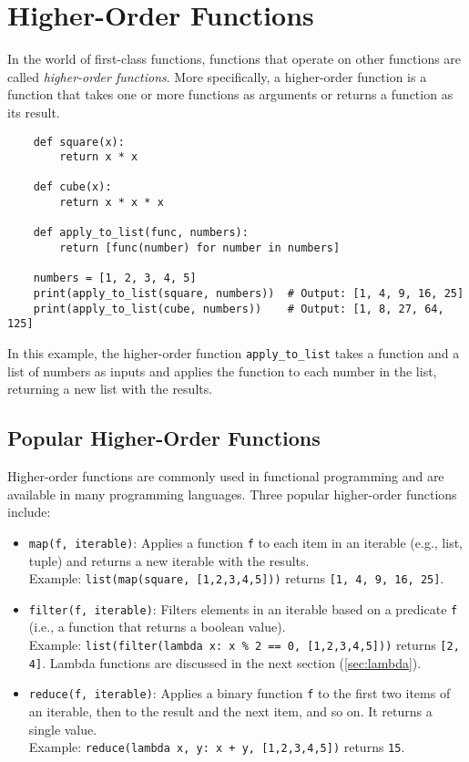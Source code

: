 \documentclass[oneside,11pt,dvipsnames]{book}
\newcommand{\code}[1]{\texttt{#1}}
\begin{document}
\section{Higher-Order Functions}\label{sec:higher-order}

In the world of first-class functions, functions that operate on other functions are called \emph{higher-order functions}. More specifically, a higher-order function is a function that takes one or more functions as arguments or returns a function as its result.

\begin{lstlisting}
    def square(x):
        return x * x

    def cube(x):
        return x * x * x

    def apply_to_list(func, numbers):
        return [func(number) for number in numbers]

    numbers = [1, 2, 3, 4, 5]
    print(apply_to_list(square, numbers))  # Output: [1, 4, 9, 16, 25]
    print(apply_to_list(cube, numbers))    # Output: [1, 8, 27, 64, 125]

\end{lstlisting}

In this example, the higher-order function \code{apply\_to\_list} takes a function and a list of numbers as inputs and applies the function to each number in the list, returning a new list with the results. 


\subsection{Popular Higher-Order Functions}

Higher-order functions are commonly used in functional programming and are available in many programming languages. Three popular higher-order functions include:

\begin{itemize}
    \item \code{map(f, iterable)}: Applies a function \code{f} to each item in an iterable (e.g., list, tuple) and returns a new iterable with the results.\\
    Example: \code{list(map(square, [1,2,3,4,5]))} returns \code{[1, 4, 9, 16, 25]}.
    \item \code{filter(f, iterable)}: Filters elements in an iterable based on a predicate \code{f} (i.e., a function that returns a boolean value).\\
    Example: \code{list(filter(lambda x: x \% 2 == 0, [1,2,3,4,5]))} returns \code{[2, 4]}. Lambda functions are discussed in the next section (\autoref{sec:lambda}).
    \item \code{reduce(f, iterable)}: Applies a binary function \code{f} to the first two items of an iterable, then to the result and the next item, and so on. It returns a single value.\\
    Example: \code{reduce(lambda x, y: x + y, [1,2,3,4,5])} returns \code{15}. 
\end{itemize}
\end{document}

